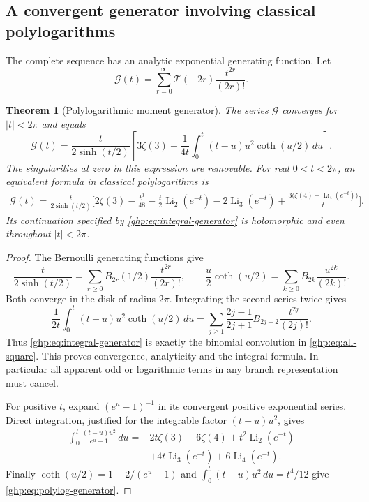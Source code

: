 \documentclass[11pt,a4paper]{article}
\numberwithin{equation}{section}
\newtheorem{theorem}{Theorem}[section]
\theoremstyle{definition}
\theoremstyle{remark}
\begin{document}
\subsection{A convergent generator involving classical polylogarithms}

The complete sequence has an analytic exponential generating function.
Let
\[
 \mathcal G(t)=\sum_{r=0}^{\infty}
               \mathcal T(-2r)\frac{t^{2r}}{(2r)!}.
\]

\begin{theorem}[Polylogarithmic moment generator]\label{ghp:thm:generator}
The series $\mathcal G$ converges for $|t|<2\pi$ and equals
\begin{equation}\label{ghp:eq:integral-generator}
 \mathcal G(t)=\frac{t}{2\sinh(t/2)}
   \left[3\zeta(3)-\frac1{4t}
       \int_0^t(t-u)u^2\coth(u/2)\,du\right].
\end{equation}
The singularities at zero in this expression are removable. For
real $0<t<2\pi$, an equivalent formula in classical polylogarithms is
\begin{align}\label{ghp:eq:polylog-generator}
 \mathcal G(t)=\frac{t}{2\sinh(t/2)}\bigg[
 2\zeta(3)-\frac{t^3}{48}
 -\frac t2\operatorname{Li}_2(e^{-t})
 -2\operatorname{Li}_3(e^{-t})
 +\frac{3\bigl(\zeta(4)-\operatorname{Li}_4(e^{-t})\bigr)}t
 \bigg].
\end{align}
Its continuation specified by \eqref{ghp:eq:integral-generator} is
holomorphic and even throughout $|t|<2\pi$.
\end{theorem}

\begin{proof}
The Bernoulli generating functions give
\[
 \frac{t}{2\sinh(t/2)}
     =\sum_{r\geq0}B_{2r}(1/2)\frac{t^{2r}}{(2r)!},
 \qquad
 \frac u2\coth(u/2)
     =\sum_{k\geq0}B_{2k}\frac{u^{2k}}{(2k)!}.
\]
Both converge in the disk of radius $2\pi$. Integrating the second
series twice gives
\[
 \frac1{2t}\int_0^t(t-u)u^2\coth(u/2)\,du
  =\sum_{j\geq1}\frac{2j-1}{2j+1}B_{2j-2}
                  \frac{t^{2j}}{(2j)!}.
\]
Thus \eqref{ghp:eq:integral-generator} is exactly the binomial
convolution in \eqref{ghp:eq:all-square}. This proves convergence,
analyticity and the integral formula. In particular all apparent odd
or logarithmic terms in any branch representation must cancel.

For positive $t$, expand $(e^u-1)^{-1}$ in its convergent positive
exponential series. Direct integration, justified for the integrable
factor $(t-u)u^2$, gives
\begin{align*}
 \int_0^t\frac{(t-u)u^2}{e^u-1}\,du
  ={}&2t\zeta(3)-6\zeta(4)
      +t^2\operatorname{Li}_2(e^{-t})\\
     &+4t\operatorname{Li}_3(e^{-t})
      +6\operatorname{Li}_4(e^{-t}).
\end{align*}
Finally $\coth(u/2)=1+2/(e^u-1)$ and
$\int_0^t(t-u)u^2\,du=t^4/12$ give
\eqref{ghp:eq:polylog-generator}.
\end{proof}
\end{document}
